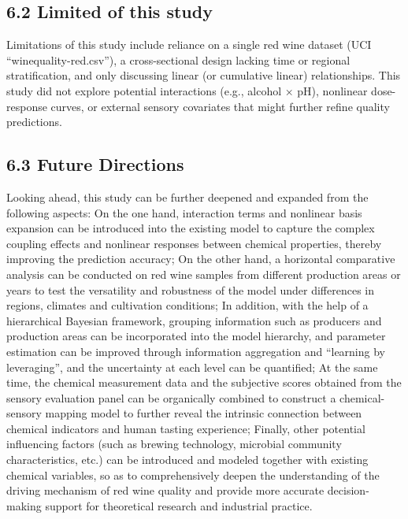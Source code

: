 \documentclass[
  doc,floatsintext]{apa6}
\begin{document}
\subsection{6.2 Limited of this study}\label{limited-of-this-study}

Limitations of this study include reliance on a single red wine dataset (UCI ``winequality-red.csv''), a cross-sectional design lacking time or regional stratification, and only discussing linear (or cumulative linear) relationships. This study did not explore potential interactions (e.g., alcohol × pH), nonlinear dose-response curves, or external sensory covariates that might further refine quality predictions.

\subsection{6.3 Future Directions}\label{future-directions}

Looking ahead, this study can be further deepened and expanded from the following aspects:
On the one hand, interaction terms and nonlinear basis expansion can be introduced into the existing model to capture the complex coupling effects and nonlinear responses between chemical properties, thereby improving the prediction accuracy;
On the other hand, a horizontal comparative analysis can be conducted on red wine samples from different production areas or years to test the versatility and robustness of the model under differences in regions, climates and cultivation conditions;
In addition, with the help of a hierarchical Bayesian framework, grouping information such as producers and production areas can be incorporated into the model hierarchy, and parameter estimation can be improved through information aggregation and ``learning by leveraging'', and the uncertainty at each level can be quantified;
At the same time, the chemical measurement data and the subjective scores obtained from the sensory evaluation panel can be organically combined to construct a chemical-sensory mapping model to further reveal the intrinsic connection between chemical indicators and human tasting experience;
Finally, other potential influencing factors (such as brewing technology, microbial community characteristics, etc.) can be introduced and modeled together with existing chemical variables, so as to comprehensively deepen the understanding of the driving mechanism of red wine quality and provide more accurate decision-making support for theoretical research and industrial practice.
\end{document}
